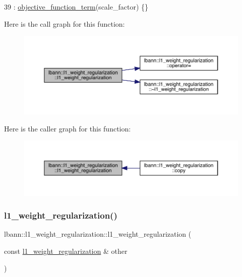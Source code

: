 \begin{DoxyCode}
39     : \hyperlink{classlbann_1_1objective__function__term_a8c019e3c880f38dc20275e395acaeca1}{objective\_function\_term}(scale\_factor) \{\}
\end{DoxyCode}
Here is the call graph for this function\+:\nopagebreak
\begin{figure}[H]
\begin{center}
\leavevmode
\includegraphics[width=350pt]{classlbann_1_1l1__weight__regularization_a8416f2197baad2b9850163ecba72a4c4_cgraph}
\end{center}
\end{figure}
Here is the caller graph for this function\+:\nopagebreak
\begin{figure}[H]
\begin{center}
\leavevmode
\includegraphics[width=350pt]{classlbann_1_1l1__weight__regularization_a8416f2197baad2b9850163ecba72a4c4_icgraph}
\end{center}
\end{figure}
\mbox{\label{classlbann_1_1l1__weight__regularization_a6d0bdc74e61eed4601667db4d64b45d3}} 
\subsubsection{\texorpdfstring{l1\+\_\+weight\+\_\+regularization()}{l1\_weight\_regularization()}\hspace{0.1cm}{\footnotesize\ttfamily [2/2]}}
{\footnotesize\ttfamily lbann\+::l1\+\_\+weight\+\_\+regularization\+::l1\+\_\+weight\+\_\+regularization (\begin{DoxyParamCaption}\item[{const \hyperlink{classlbann_1_1l1__weight__regularization}{l1\+\_\+weight\+\_\+regularization} \&}]{other }\end{DoxyParamCaption})\hspace{0.3cm}{\ttfamily [default]}}

